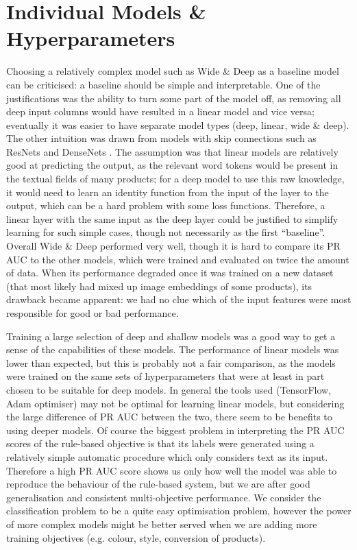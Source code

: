 \section{Individual Models \& Hyperparameters}

Choosing a relatively complex model such as Wide \& Deep as a baseline model can be criticised: a baseline should be simple and interpretable.
One of the justifications was the ability to turn some part of the model off, as removing all deep input columns would have resulted in a linear model and vice versa; eventually it was easier to have separate model types (deep, linear, wide \& deep).
The other intuition was drawn from models with skip connections such as ResNets \cite{resnet} and DenseNets \cite{densenet}.
The assumption was that linear models are relatively good at predicting the output, as the relevant word tokens would be present in the textual fields of many products; for a deep model to use this raw knowledge, it would need to learn an identity function from the input of the layer to the output, which can be a hard problem with some loss functions.
Therefore, a linear layer with the same input as the deep layer could be justified to simplify learning for such simple cases, though not necessarily as the first ``baseline''.
Overall Wide \& Deep performed very well, though it is hard to compare its PR AUC to the other models, which were trained and evaluated on twice the amount of data.
When its performance degraded once it was trained on a new dataset (that most likely had mixed up image embeddings of some products), its drawback became apparent: we had no clue which of the input features were most responsible for good or bad performance.

Training a large selection of deep and shallow models was a good way to get a sense of the capabilities of these models.
The performance of linear models was lower than expected, but this is probably not a fair comparison, as the models were trained on the same sets of hyperparameters that were at least in part chosen to be suitable for deep models.
In general the tools used (TensorFlow, Adam optimiser) may not be optimal for learning linear models, but considering the large difference of PR AUC between the two, there seem to be benefits to using deeper models.
Of course the biggest problem in interpreting the PR AUC scores of the rule-based objective is that its labels were generated using a relatively simple automatic procedure which only considers text as its input.
Therefore a high PR AUC score shows us only how well the model was able to reproduce the behaviour of the rule-based system, but we are after good generalisation and consistent multi-objective performance.
We consider the classification problem to be a quite easy optimisation problem, however the power of more complex models might be better served when we are adding more training objectives (e.g. colour, style, conversion of products).

